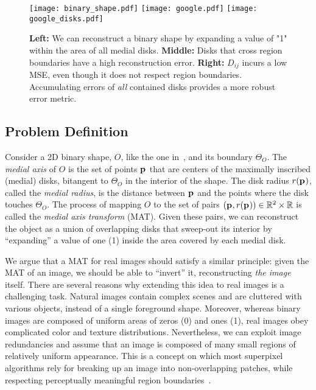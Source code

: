 \documentclass[10pt,twocolumn,letterpaper]{article}
\begin{document}
\begin{figure*}[t]
\centering
\texttt{[image: binary\_shape.pdf]}
\texttt{[image: google.pdf]}\hfill
\texttt{[image: google\_disks.pdf]}
\caption{\textbf{Left:} We can reconstruct a binary shape by expanding a value of "1" within the area of all medial disks.
\textbf{Middle:} Disks that cross region boundaries have a high reconstruction error.
\textbf{Right:} $D_{ij}$ incurs a low MSE, even though it does not respect region boundaries.
Accumulating errors of \emph{all} contained disks provides a more robust error metric.}
\label{fig:method:definition}
\end{figure*}

\subsection{Problem Definition}\label{sec:method:definition}
Consider a 2D binary shape, $O$, like the one in~, and its boundary $\Theta_O$.
The \emph{medial axis} of $O$ is the set of points $\mathbf{p}_{}$ that
are centers of the maximally inscribed (medial) disks, bitangent to $\Theta_O$
in the interior of the shape. The disk radius $r(\mathbf{p}_{})$, called the \emph{medial radius}, 
is the distance between $\mathbf{p}_{}$ and the points where the disk touches $\Theta_O$.
The process of mapping $O$ to the set of pairs $(\mathbf{p}_{},r(\mathbf{p}_{})) \in \mathbb{R}^2 \times \mathbb{R}$
is called the \emph{medial axis transform} (MAT).
Given these pairs, we can reconstruct the object as a union of overlapping disks that sweep-out 
its interior by ``expanding'' a value of one (1) inside the area covered by each  medial disk.

We argue that a MAT for real images should satisfy a similar principle: given the MAT of an image, 
we should be able to ``invert'' it, reconstructing \emph{the image} itself.
There are several reasons why extending this idea to real images is a challenging task. 
Natural images contain complex scenes and are cluttered with various objects, instead of a single foreground shape.
Moreover, whereas binary images are composed of uniform areas of zeros (0) and ones (1), 
real images obey complicated color and texture distributions.
Nevertheless, we can exploit image redundancies and assume that an image is composed of many small regions of 
relatively uniform appearance.
This is a concept on which most superpixel algorithms rely for breaking up an image 
into non-overlapping patches, while respecting perceptually meaningful region 
boundaries~\cite{shi2000normalized,levinshtein2009turbopixels,achanta2012slic}. 
\end{document}
